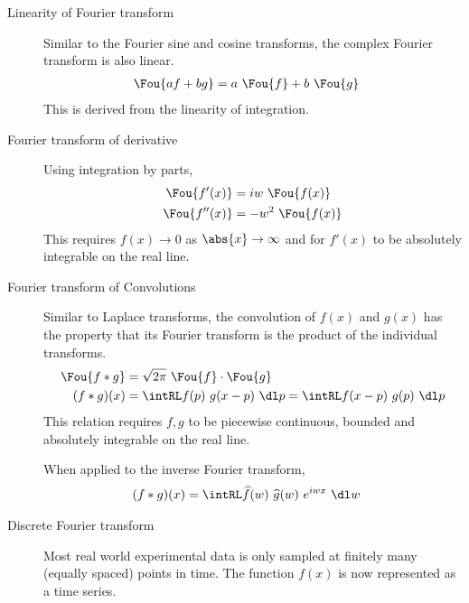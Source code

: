 \begin{description}
    \item[Linearity of Fourier transform] Similar to the Fourier sine and cosine
        transforms, the complex Fourier transform is also linear.
        \begin{align}
            \Fou\{af + bg\} & = a\ \Fou\{f\} + b\ \Fou\{g\}
        \end{align}
        This is derived from the linearity of integration.

    \item[Fourier transform of derivative] Using integration by parts,
        \begin{align}
            \Fou\{f'(x)\}  & = iw\ \Fou\{f(x)\}   \\
            \Fou\{f''(x)\} & = -w^2\ \Fou\{f(x)\}
        \end{align}
        This requires $ f(x) \to 0 $ as $ \abs{x} \to \infty $ and for
        $ f'(x) $ to be absolutely integrable on the real line.

    \item[Fourier transform of Convolutions] Similar to Laplace transforms, the
        convolution of $ f(x) $ and $ g(x) $ has the property that its Fourier transform
        is the product of the individual transforms.
        \begin{align}
            \Fou\{f * g\} & = \sqrt{2\pi}\ \Fou\{f\} \cdot \Fou\{g\} \\
            (f * g)(x)    & = \intRL f(p)\ g(x-p)\ \dl p
            = \intRL f(x-p)\ g(p)\ \dl p
        \end{align}
        This relation requires $ f, g $ to be piecewise continuous, bounded and
        absolutely integrable on the real line. \par
        When applied to the inverse Fourier transform,
        \begin{align}
            (f * g)(x) & = \intRL \widehat{f}(w)\ \widehat{g}(w)\ e^{iwx}\ \dl w
        \end{align}

    \item[Discrete Fourier transform] Most real world experimental data is only sampled
        at finitely many (equally spaced) points in time. The function $ f(x) $ is now
        represented as a time series. \par


\end{description}
